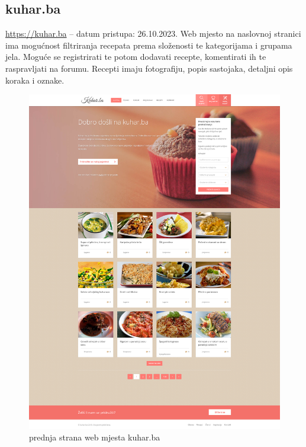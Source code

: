 		\subsection{kuhar.ba}
			\url{https://kuhar.ba} -- datum pristupa: 26.10.2023.
			Web mjesto na naslovnoj stranici ima mogućnost filtriranja recepata prema složenosti te kategorijama i grupama jela. Moguće se registrirati te potom dodavati recepte, komentirati ih te raspravljati na forumu. Recepti imaju fotografiju, popis sastojaka, detaljni opis koraka i oznake.
				\begin{figure}[H]
					\centering
					\includegraphics[scale=0.1]{slike/02-01-kuhar-ba.PNG}
					\caption{prednja strana web mjesta kuhar.ba}
					\label{fig:kuhar-ba-front}
				\end{figure} 
	

